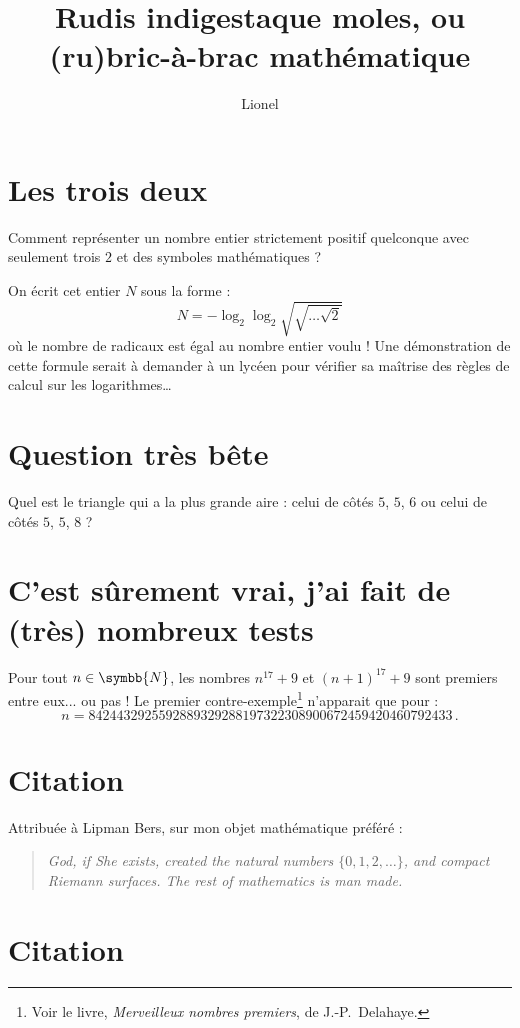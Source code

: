 \documentclass[a4paper,11pt]{article}
\title{Rudis indigestaque moles, ou (ru)bric-à-brac mathématique}
\author{Lionel \bsc{V\kern-1pt idal}}
\newcommand{\N}{\ensuremath{\symbb{N}}\xspace}
\begin{document}
\maketitle

\section{Les trois deux}

Comment représenter un nombre entier strictement positif quelconque avec
seulement trois $2$ et des symboles mathématiques ?

On écrit cet entier $N$ sous la forme :
\[ N = -\log_2 \log_2 \sqrt{\sqrt{\ldots\sqrt{2}}} \]
où le nombre de radicaux est égal au nombre entier voulu ! Une démonstration
de cette formule serait à demander à un lycéen pour vérifier sa maîtrise des
règles de calcul sur les logarithmes\dots

\section{Question très bête}

Quel est le triangle qui a la plus grande aire : celui de côtés $5$, $5$,
$6$ ou celui de côtés $5$, $5$, $8$ ?

\section{C'est sûrement vrai, j'ai fait de (très) nombreux tests}

Pour tout $n\in\N$, les nombres $n^{17}+9$ et $(n+1)^{17}+9$ sont premiers
entre eux... ou pas !
Le premier contre-exemple\footnote{
  Voir le livre, {\slshape Merveilleux nombres premiers}, de J.-P.~Delahaye.}
n'apparait que pour :
\[ n = 8424432925592889329288197322308900672459420460792433\,. \]

\section{Citation}

Attribuée à Lipman Bers, sur mon objet mathématique préféré :
\begin{quotation}\itshape\noindent
  God, if She exists, created the natural numbers $\{0,1,2,\ldots\}$,
  and compact Riemann surfaces. The rest of mathematics is man made.
\end{quotation}

\section{Citation}
\end{document}
